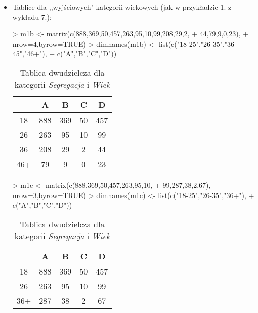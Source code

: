 \documentclass[12pt]{mwart}
\begin{document}
\begin{itemize}[label=$\bullet$]
	\item Tablice dla ,,wyjściowych" kategorii wiekowych (jak w przykładzie 1. z wykładu 7.):
\begin{Schunk}
\begin{Sinput}
> m1b <- matrix(c(888,369,50,457,263,95,10,99,208,29,2,
+ 		44,79,9,0,23),
+ 		nrow=4,byrow=TRUE)
> dimnames(m1b) <- list(c("18-25","26-35","36-45","46+"),
+ 		c("A","B","C","D"))
\end{Sinput}
\end{Schunk}

\begin{table}[h!]
	\begin{center}
		\begin{tabular}{|c|c|c|c|c|}
			\hline
			& A & B & C & D \\\hline
			18\dywiz25 & 888& 369& 50& 457 \\\hline
			26\dywiz35 & 263& 95& 10& 99 \\\hline
			36\dywiz45 & 208& 29& 2& 44 \\\hline
			46+ & 79& 9& 0& 23 \\\hline
		\end{tabular}
	\end{center}
	\caption{Tablica dwudzielcza dla kategorii \emph{Segregacja} i \emph{Wiek}}
	\label{tab:tabela6}
\end{table}

\begin{Schunk}
\begin{Sinput}
> m1c <- matrix(c(888,369,50,457,263,95,10,
+ 		99,287,38,2,67),
+ 		nrow=3,byrow=TRUE)
> dimnames(m1c) <- list(c("18-25","26-35","36+"),
+ 		c("A","B","C","D"))
\end{Sinput}
\end{Schunk}

\begin{table}[h!]
	\begin{center}
		\begin{tabular}{|c|c|c|c|c|}
			\hline
			& A & B & C & D \\\hline
			18\dywiz25 & 888& 369& 50& 457 \\\hline
			26\dywiz35 & 263& 95& 10& 99 \\\hline
			36+ & 287& 38& 2& 67 \\\hline
		\end{tabular}
	\end{center}
	\caption{Tablica dwudzielcza dla kategorii \emph{Segregacja} i \emph{Wiek}}
	\label{tab:tabela7}
\end{table}
\end{itemize}
\end{document}
